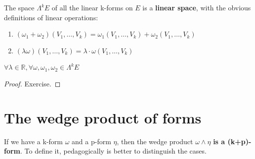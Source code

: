 \documentclass[../main.tex]{subfiles}
\begin{document}
\begin{proposition}
The space $\Lambda^k E$ of all the linear k-forms on $E$ is a \textbf{linear space}, with the obvious definitions of linear operations:
\begin{enumerate}
\item $(\omega_1+\omega_2)(V_1,\dots,V_k)=\omega_1(V_1,\dots,V_k)+\omega_2(V_1,\dots,V_k)$
\item $(\lambda\omega)(V_1,\dots,V_k)=\lambda\cdot\omega(V_1,\dots,V_k)$
\end{enumerate}
$\forall\lambda\in\mathbb{R},\forall\omega,\omega_1,\omega_2\in\Lambda^kE$
\end{proposition}
\begin{proof}
Exercise. 
\end{proof}
\section{The wedge product of forms}
If we have a k-form $\omega$ and a p-form $\eta$, then the wedge product $\omega\wedge\eta$ \textbf{is a (k+p)-form}. To define it, pedagogically is better to distinguish the cases.
\end{document}
